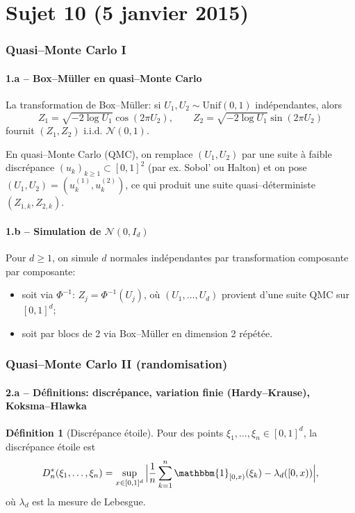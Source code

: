 \documentclass[11pt,a4paper]{article}
\newcommand{\1}{\mathbbm{1}}
\theoremstyle{plain}
\theoremstyle{definition}
\newtheorem{definition}{Définition}
\begin{document}
\part{Sujet 10 (5 janvier 2015)}

\section{Quasi--Monte Carlo I}
\subsection{1.a -- Box--Müller en quasi--Monte Carlo}
La transformation de Box--Müller: si $U_1,U_2\sim\mathrm{Unif}(0,1)$ indépendantes, alors
\[
Z_1=\sqrt{-2\log U_1}\cos(2\pi U_2),\qquad
Z_2=\sqrt{-2\log U_1}\sin(2\pi U_2)
\]
fournit $(Z_1,Z_2)$ i.i.d. $\mathcal{N}(0,1)$.
\medskip

En quasi--Monte Carlo (QMC), on remplace $(U_1,U_2)$ par une suite à faible discrépance $(u_k)_{k\ge 1}\subset[0,1]^2$ (par ex. Sobol' ou Halton) et on pose
$(U_1,U_2)=(u_k^{(1)},u_k^{(2)})$, ce qui produit une suite quasi--déterministe $(Z_{1,k},Z_{2,k})$.

\subsection{1.b -- Simulation de $\mathcal{N}(0,I_d)$}
Pour $d\ge 1$, on simule $d$ normales indépendantes par transformation composante par composante:
\begin{itemize}[leftmargin=*]
  \item soit via $\Phi^{-1}$: $Z_j=\Phi^{-1}(U_j)$, où $(U_1,\dots,U_d)$ provient d'une suite QMC sur $[0,1]^d$;
  \item soit par blocs de 2 via Box--Müller en dimension 2 répétée.
\end{itemize}

\section{Quasi--Monte Carlo II (randomisation)}
\subsection{2.a -- Définitions: discrépance, variation finie (Hardy--Krause), Koksma--Hlawka}
\begin{definition}[Discrépance étoile]
Pour des points $\xi_1,\dots,\xi_n\in[0,1]^d$, la discrépance étoile est
\[
D_n^*(\xi_1,\dots,\xi_n)
=\sup_{x\in[0,1]^d}\Big|\frac{1}{n}\sum_{k=1}^n \1_{[0,x)}(\xi_k)-\lambda_d([0,x))\Big|,
\]
où $\lambda_d$ est la mesure de Lebesgue.
\end{definition}
\end{document}
